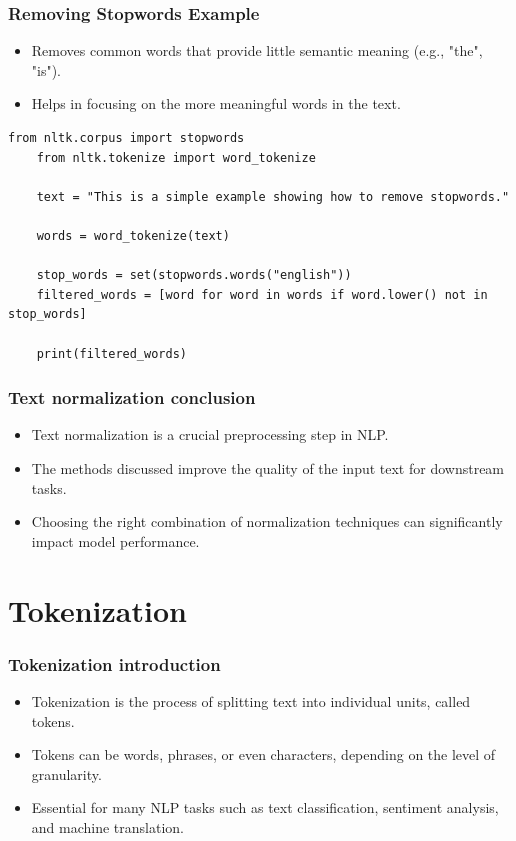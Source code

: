 \documentclass{beamer}
\begin{document}
\begin{frame}[fragile]
    \frametitle{Removing Stopwords Example}
    \begin{itemize}
        \item Removes common words that provide little semantic meaning (e.g., "the", "is").
        \item Helps in focusing on the more meaningful words in the text.
    \end{itemize}
    \begin{lstlisting}[style=pythonStyle, caption=Removing Stopwords in Python with NLTK]
    from nltk.corpus import stopwords
    from nltk.tokenize import word_tokenize

    text = "This is a simple example showing how to remove stopwords."

    words = word_tokenize(text)

    stop_words = set(stopwords.words("english"))
    filtered_words = [word for word in words if word.lower() not in stop_words]

    print(filtered_words)
    \end{lstlisting}
\end{frame}

\begin{frame}
    \frametitle{Text normalization conclusion}
    \begin{itemize}
        \item Text normalization is a crucial preprocessing step in NLP.
        \item The methods discussed improve the quality of the input text for downstream tasks.
        \item Choosing the right combination of normalization techniques can significantly impact model performance.
    \end{itemize}
\end{frame}

\section{Tokenization}

\begin{frame}
    \frametitle{Tokenization introduction}
    \begin{itemize}
        \item Tokenization is the process of splitting text into individual units, called tokens.
        \item Tokens can be words, phrases, or even characters, depending on the level of granularity.
        \item Essential for many NLP tasks such as text classification, sentiment analysis, and machine translation.
    \end{itemize}
\end{frame}
\end{document}
